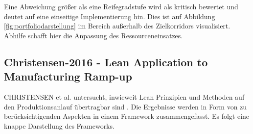 Eine Abweichung größer als eine Reifegradstufe wird als kritisch bewertet und deutet auf eine einseitige Implementierung hin. Dies ist auf Abbildung \ref{fig:portfoliodarstellung} im Bereich außerhalb des Zielkorridors visualisiert.  Abhilfe schafft hier die Anpassung des Ressourceneinsatzes. 


\subsection*{Christensen-2016 - Lean Application to Manufacturing Ramp-up}\label{sec:christensen}
CHRISTENSEN et al. untersucht, inwieweit Lean Prinzipien und Methoden auf den Produktionsanlauf übertragbar sind \autocite{Christensen2016}. 
Die Ergebnisse werden in Form von zu berücksichtigenden Aspekten in einem Framework zusammengefasst. Es folgt eine knappe Darstellung des Frameworks. 

